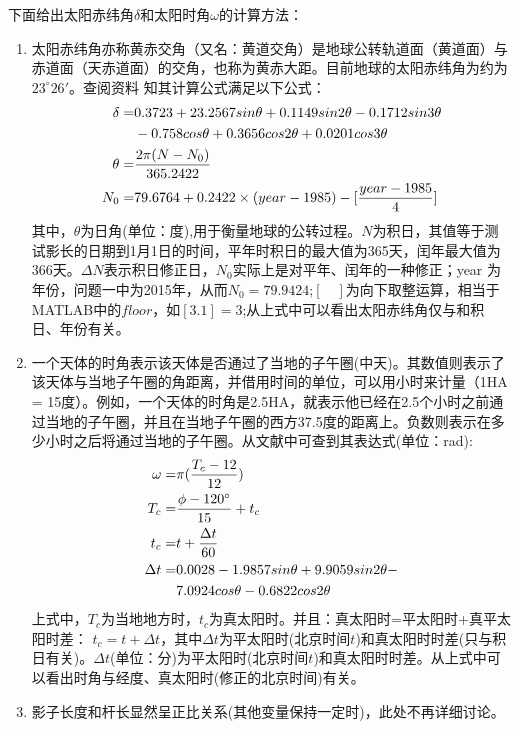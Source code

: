 \documentclass[12pt]{cumcmart}   %
\begin{document}
下面给出太阳赤纬角$\delta$和太阳时角$\omega$的计算方法：
\begin{enumerate}
	\item 太阳赤纬角亦称黄赤交角（又名：黄道交角）是地球公转轨道面（黄道面）与赤道面（天赤道面）的交角，也称为黄赤大距。目前地球的太阳赤纬角为约为$23^\circ 26'$。查阅资料 \cite{Wu2017A} 知其计算公式满足以下公式：
	\begin{align}
	\delta=&0.3723+23.2567sin\theta+0.1149sin2\theta-0.1712sin3\theta\\
	&-0.758cos\theta+0.3656cos2\theta+0.0201cos3\theta \notag  \\
		\theta=&\frac{2\pi (N-N_0 )}{365.2422} \\
		N_0=&79.6764+0.2422 \times(year-1985)-[\frac{year-1985}{4}]
	\end{align}
	其中，$\theta$为日角(单位：度),用于衡量地球的公转过程。$N$为积日，其值等于测试影长的日期到1月1日的时间，平年时积日的最大值为365天，闰年最大值为366天。$\Delta N$表示积日修正日，$N_0$实际上是对平年、闰年的一种修正；year 为年份，问题一中为2015年，从而$N_0=79.9424$;$[\quad]$为向下取整运算，相当于MATLAB中的$floor$，如$[3.1]=3$;从上式中可以看出太阳赤纬角仅与和积日、年份有关。
	
	
	\item 一个天体的时角表示该天体是否通过了当地的子午圈(中天)。其数值则表示了该天体与当地子午圈的角距离，并借用时间的单位，可以用小时来计量（1HA = 15度）。例如，一个天体的时角是2.5HA，就表示他已经在2.5个小时之前通过当地的子午圈，并且在当地子午圈的西方37.5度的距离上。负数则表示在多少小时之后将通过当地的子午圈。从文献中可查到其表达式(单位：rad):
	\begin{align}
\omega=&\pi(\frac{T_c-12}{12})    \label{shijiao} \\
	  T_c=&\frac{\phi-120^\circ}{15}+t_c\\
	  t_{c}=&t+\frac{\Delta t}{60}\\
	  \Delta t=&0.0028-1.9857sin\theta+9.9059sin2\theta-\\
	  &7.0924cos\theta-0.6822cos2\theta  \notag
	\end{align}
	上式中，$T_c$为当地地方时，$t_{c}$为真太阳时。并且：真太阳时=平太阳时+真平太阳时差：	$t_{c}=t+\Delta t$，其中$\Delta t$为平太阳时(北京时间$t$)和真太阳时时差(只与积日有关)。$\Delta t$(单位：分)为平太阳时(北京时间$t$)和真太阳时时差。从上式中可以看出时角与经度、真太阳时(修正的北京时间)有关。
	\item 影子长度和杆长显然呈正比关系(其他变量保持一定时)，此处不再详细讨论。
\end{enumerate}
\end{document}
